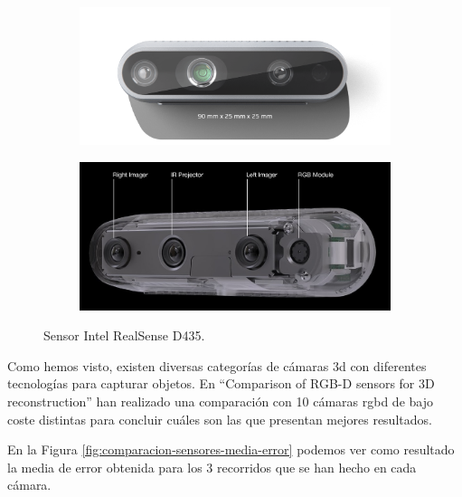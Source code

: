 \begin{figure}[h]
    \centering
    \begin{subfigure}{0.4\textwidth}
    	\centering
        \includegraphics[width=\textwidth]{archivos/d435_image.png}
    \end{subfigure}
    \begin{subfigure}{0.5\textwidth}
    	\centering
        \includegraphics[width=\textwidth]{archivos/d435_sensors.jpg}
    \end{subfigure}
    \caption{Sensor Intel RealSense D435.}
    \label{fig:d435-sensors}
\end{figure}

Como hemos visto, existen diversas categorías de cámaras \gls{3d} con diferentes tecnologías para capturar objetos.
En ``Comparison of RGB-D sensors for 3D reconstruction'' \citep{DaSilvaNeto2020} han realizado una comparación con 10 cámaras \gls{rgbd} de bajo coste distintas para concluir cuáles son las que presentan mejores resultados.

En la Figura \ref{fig:comparacion-sensores-media-error} podemos ver como resultado la media de error obtenida para los 3 recorridos que se han hecho en cada cámara.

